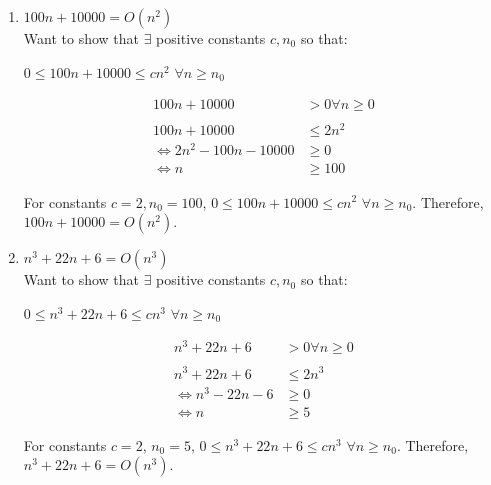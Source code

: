 \documentclass[11pt, letter]{article}
\begin{document}
    \begin{enumerate}
    
    \item $100n + 10000 = O(n^2)$\\

    Want to show that $\exists$ positive constants $c, n_0$ so that:
    
    \begin{center}
    $0 \leq 100n + 10000 \leq cn^2$ $\forall n \geq n_0$
    \end{center}
    
    \begin{equation*}
        \begin{split}
            100n + 10000 &> 0 \forall n \geq 0\\
            \\
            100n + 10000 &\leq 2n^2\\
            \Leftrightarrow 2n^2 - 100n - 10000 &\geq 0\\
            \Leftrightarrow n &\geq 100
        \end{split}
    \end{equation*}
    
    For constants $c = 2, n_0 = 100$, $0 \leq 100n + 10000 \leq cn^2$ $\forall n \geq n_0$. Therefore, $100n + 10000 = O(n^2)$.

    \item $n^3 + 22n + 6 = O(n^3)$\\

    Want to show that $\exists$ positive constants $c, n_0$ so that:

    \begin{center}
    $0 \leq n^3 + 22n + 6 \leq cn^3$ $\forall n \geq n_0$
    \end{center}
    
    \begin{equation*}
        \begin{split}
            n^3 + 22n + 6 &> 0 \forall n \geq 0\\
            \\
            n^3 + 22n + 6 &\leq 2n^3\\
            \Leftrightarrow n^3 - 22n - 6 &\geq 0\\
            \Leftrightarrow n &\geq 5
        \end{split}
    \end{equation*}
    
    For constants $c=2$, $n_0 = 5$, $0 \leq n^3 + 22n + 6 \leq cn^3$ $\forall n \geq n_0$. Therefore, $n^3 + 22n + 6 = O(n^3)$.


\end{enumerate}
\end{document}
